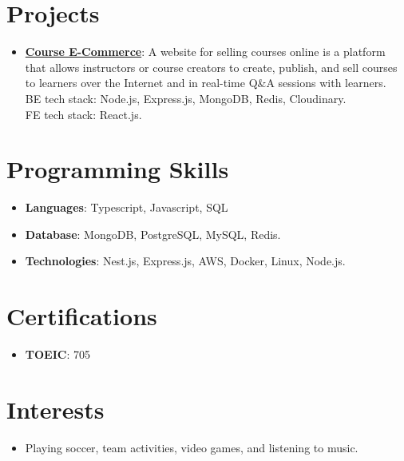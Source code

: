\documentclass[letterpaper,12pt]{article}
\newcommand{\resumeItem}[2]{
  \item\small{
    \textbf{#1}{: #2 \vspace{-2pt}}
  }
}
\newcommand{\resumeSubItem}[2]{\resumeItem{#1}{#2}\vspace{-4pt}}
\newcommand{\resumeSubHeadingListStart}{\begin{itemize}[leftmargin=*]}
\newcommand{\resumeSubHeadingListEnd}{\end{itemize}}
\begin{document}
\section{Projects}
\resumeSubHeadingListStart
  \resumeSubItem{\href{https://cec.hnam.id.vn}{Course E-Commerce}}
    {A website for selling courses online is a platform that allows instructors or course creators to create, publish, and sell courses to learners over the Internet and in real-time Q\&A sessions with learners.\\
    BE tech stack: Node.js, Express.js, MongoDB, Redis, Cloudinary. \\
    FE tech stack: React.js.}
\resumeSubHeadingListEnd

\section{Programming Skills}
\resumeSubHeadingListStart
  \item{
    \textbf{Languages}{: Typescript, Javascript, SQL}
  }
  \item{
    \textbf{Database}{: MongoDB, PostgreSQL, MySQL, Redis. }
  }
  \item{
    \textbf{Technologies}{: Nest.js, Express.js, AWS, Docker, Linux, Node.js. }
  }
\resumeSubHeadingListEnd

\section{Certifications}
\resumeSubHeadingListStart
  \item{
    \textbf{TOEIC}{: 705}
  }
\resumeSubHeadingListEnd

\section{Interests}
\resumeSubHeadingListStart
  \item{
    Playing soccer, team activities, video games, and listening to music.
  }
\resumeSubHeadingListEnd

\end{document}
